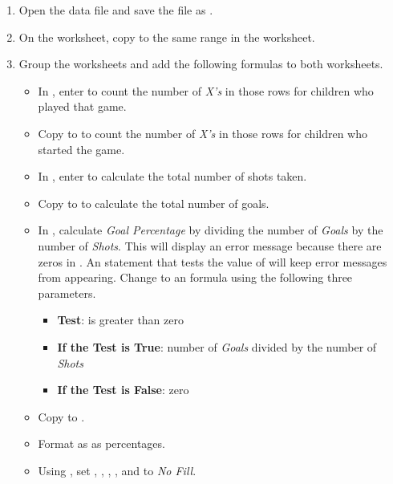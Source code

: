 \begin{enumerate}
	\item Open the data file  and save the file as .
	\item On the  worksheet, copy  to the same range in the  worksheet.
	\item Group the worksheets and add the following formulas to both worksheets.

	\begin{itemize}
		\item In , enter  to count the number of \textit{X's} in those rows for children who played that game.
		\item Copy  to  to count the number of \textit{X's} in those rows for children who started the game.
		\item In , enter  to calculate the total number of shots taken. 
		\item Copy  to  to calculate the total number of goals.
		\item In , calculate \textit{Goal Percentage} by dividing the number of \textit{Goals} by the number of \textit{Shots}. This will display an error message because there are zeros in . An  statement that tests the value of  will keep error messages from appearing. Change  to an  formula using the following three parameters.
		\begin{itemize}
			\item \textbf{Test}: is  greater than zero
			\item \textbf{If the Test is True}: number of \textit{Goals} divided by the number of \textit{Shots}
			\item \textbf{If the Test is False}: zero
		\end{itemize}
		\item Copy  to .
		\item Format  as as percentages.
		\item Using , set , , , , and  to \textit{No Fill}. 
		\end{itemize}	
	

\end{enumerate}
